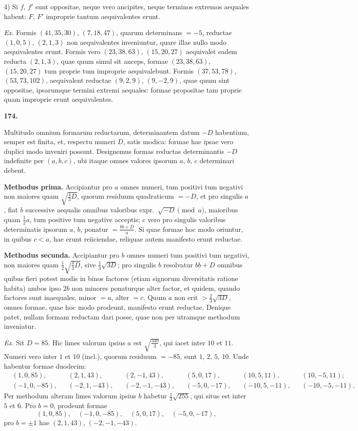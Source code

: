 \documentclass[12pt,a4paper]{article}
\theoremstyle{plain}
\begin{document}
4) Si $f$, $f'$ sunt oppositae, neque vero ancipites, neque terminos extremos aequales habent: $F$, $F'$ improprie tantum aequivalentes erunt.

\textit{Ex.} Formis $(41,35,30)$, $(7,18,47)$, quarum determinans $= -5$, reductae $(1,0,5)$, $(2,1,3)$ non aequivalentes inveniuntur, quare illae nullo modo aequivalentes erunt. Formis vero $(23,38,63)$, $(15,20,27)$ aequivalet eadem reducta $(2,1,3)$, quae quum simul sit anceps, formae $(23,38,63)$, $(15,20,27)$ tum proprie tum improprie aequivalebunt. Formis $(37,53,78)$, $(53,73,102)$, aequivalent reductae $(9,2,9)$, $(9,-2,9)$, quae quum sint oppositae, ipsarumque termini extremi aequales: formae propositae tam proprie quam improprie erunt aequivalentes.

\bigskip

\textbf{174.}

Multitudo omnium formarum reductarum, determinantem datum $-D$ habentium, semper est finita, et, respectu numeri $D$, satis modica: formae hae ipsae vero duplici modo inveniri possunt. Designemus formas reductas determinantis $-D$ indefinite per $(a,b,c)$, ubi itaque omnes valores ipsorum $a$, $b$, $c$ determinari debent.

\textbf{Methodus prima.} Accipiantur pro $a$ omnes numeri, tum positivi tum negativi non maiores quam $\sqrt{\frac{4}{3}D}$, quorum residuum quadraticum $= -D$, et pro singulis $a$, fiat $b$ successive aequalis omnibus valoribus expr.~$\sqrt{-D} \pmod{a}$, maioribus quam $\frac{1}{2}a$, tum positive tum negative acceptis; $c$ vero pro singulis valoribus determinatis ipsorum $a$, $b$, ponatur $= \frac{bb+D}{a}$. Si quae formae hoc modo oriuntur, in quibus $c < a$, hae erunt reiiciendae, reliquae autem manifesto erunt reductae.

\textbf{Methodus secunda.} Accipiantur pro $b$ omnes numeri tum positivi tum negativi, non maiores quam $\frac{1}{2}\sqrt{\frac{4}{3}D}$, sive $\frac{1}{3}\sqrt{3D}$; pro singulis $b$ resolvatur $bb+D$ omnibus quibus fieri potest modis in binos factores (etiam signorum diversitatis ratione habita) ambos ipso $2b$ non minores ponaturque alter factor, et quidem, quando factores sunt inaequales, minor $= a$, alter $= c$. Quum $a$ non erit $> \frac{2}{3}\sqrt{3D}$, omnes formae, quae hoc modo prodeunt, manifesto erunt reductae. Denique patet, nullam formam reductam dari posse, quae non per utramque methodum inveniatur.

\textit{Ex.} Sit $D = 85$. Hic limes valorum ipsius $a$ est $\sqrt{\frac{340}{3}}$, qui iacet inter $10$ et $11$. Numeri vero inter $1$ et $10$ (incl.), quorum residuum $= -85$, sunt $1$, $2$, $5$, $10$. Unde habentur formae duodecim:
\[
\begin{aligned}
&(1,0,85), &&(2,1,43), &&(2,-1,43), &&(5,0,17), &&(10,5,11), &&(10,-5,11);\\
&(-1,0,-85), &&(-2,1,-43), &&(-2,-1,-43), &&(-5,0,-17), &&(-10,5,-11), &&(-10,-5,-11).
\end{aligned}
\]
Per methodum alteram limes valorum ipsius $b$ habetur $\frac{1}{3}\sqrt{255}$, qui situs est inter $5$ et $6$. Pro $b = 0$, prodeunt formae
\[
(1,0,85), \quad (-1,0,-85), \quad (5,0,17), \quad (-5,0,-17),
\]
pro $b = \pm 1$ hae $(2,1,43)$, $(-2,-1,-43)$.
\end{document}
